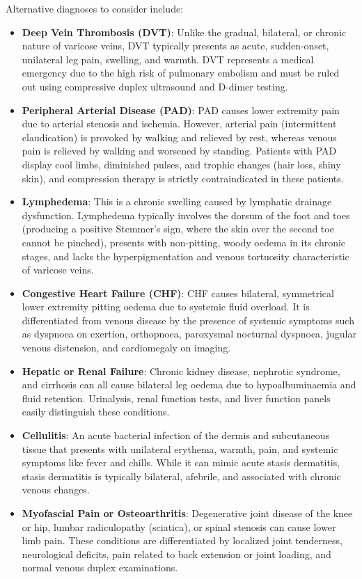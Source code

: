 Alternative diagnoses to consider include:
\begin{itemize}
\item \textbf{Deep Vein Thrombosis (DVT)}: Unlike the gradual, bilateral, or chronic nature of varicose veins, DVT typically presents as acute, sudden-onset, unilateral leg pain, swelling, and warmth. DVT represents a medical emergency due to the high risk of pulmonary embolism and must be ruled out using compressive duplex ultrasound and D-dimer testing.
\item \textbf{Peripheral Arterial Disease (PAD)}: PAD causes lower extremity pain due to arterial stenosis and ischemia. However, arterial pain (intermittent claudication) is provoked by walking and relieved by rest, whereas venous pain is relieved by walking and worsened by standing. Patients with PAD display cool limbs, diminished pulses, and trophic changes (hair loss, shiny skin), and compression therapy is strictly contraindicated in these patients.
\item \textbf{Lymphedema}: This is a chronic swelling caused by lymphatic drainage dysfunction. Lymphedema typically involves the dorsum of the foot and toes (producing a positive Stemmer's sign, where the skin over the second toe cannot be pinched), presents with non-pitting, woody oedema in its chronic stages, and lacks the hyperpigmentation and venous tortuosity characteristic of varicose veins.
\item \textbf{Congestive Heart Failure (CHF)}: CHF causes bilateral, symmetrical lower extremity pitting oedema due to systemic fluid overload. It is differentiated from venous disease by the presence of systemic symptoms such as dyspnoea on exertion, orthopnoea, paroxysmal nocturnal dyspnoea, jugular venous distension, and cardiomegaly on imaging.
\item \textbf{Hepatic or Renal Failure}: Chronic kidney disease, nephrotic syndrome, and cirrhosis can all cause bilateral leg oedema due to hypoalbuminaemia and fluid retention. Urinalysis, renal function tests, and liver function panels easily distinguish these conditions.
\item \textbf{Cellulitis}: An acute bacterial infection of the dermis and subcutaneous tissue that presents with unilateral erythema, warmth, pain, and systemic symptoms like fever and chills. While it can mimic acute stasis dermatitis, stasis dermatitis is typically bilateral, afebrile, and associated with chronic venous changes.
\item \textbf{Myofascial Pain or Osteoarthritis}: Degenerative joint disease of the knee or hip, lumbar radiculopathy (sciatica), or spinal stenosis can cause lower limb pain. These conditions are differentiated by localized joint tenderness, neurological deficits, pain related to back extension or joint loading, and normal venous duplex examinations.
\end{itemize}

